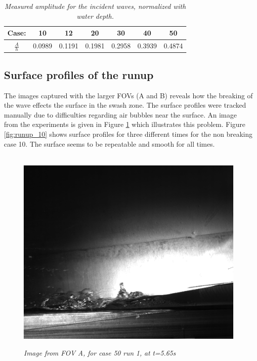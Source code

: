 \begin{table}[]
\centering
\begin{tabular}{|c|c|c|c|c|c|c|}
\hline
Case:        & 10     & 12     & 20     & 30     & 40     & 50     \\ \hline
$\frac{A}{h}$ & 0.0989 & 0.1191 & 0.1981 & 0.2958 & 0.3939 & 0.4874 \\ \hline
\end{tabular}
\caption{\textit{Measured amplitude for the incident waves, normalized with water depth.}}
\label{tab:real_ah}
\end{table}


\subsection{Surface profiles of the runup}
\label{surf_pro}
The images captured with the larger FOVs (A and B) reveals how the breaking of the wave effects the surface in the swash zone. The surface profiles were tracked manually due to difficulties regarding air bubbles near the surface. An image from the experiments is given in Figure \ref{fig:overflate_bilde} which illustrates this problem. Figure \ref{fig:runup_10} shows surface profiles for three different times for the non breaking case 10. The surface seems to be repeatable and smooth for all times.
\begin{figure}[]
        \centering
        ~ %
                \includegraphics[scale=0.15]{./Figures/overflate_bilde.png}
                \caption{\textit{ Image from FOV A, for case 50 run 1, at t=5.65s }}
                \label{fig:overflate_bilde}
        \end{figure}


